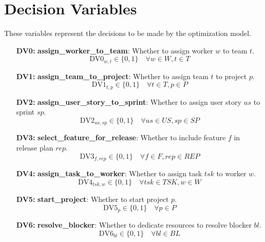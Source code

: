 \documentclass{article}
\begin{document}
\section{Decision Variables}
These variables represent the decisions to be made by the optimization model.
\begin{itemize}
    \item[\textbf{DV0:}] \textbf{assign\_worker\_to\_team}: Whether to assign worker $w$ to team $t$.
    \begin{equation*}
        \text{DV0}_{w,t} \in \{0, 1\} \quad \forall w \in W, t \in T
    \end{equation*}
    \item[\textbf{DV1:}] \textbf{assign\_team\_to\_project}: Whether to assign team $t$ to project $p$.
    \begin{equation*}
        \text{DV1}_{t,p} \in \{0, 1\} \quad \forall t \in T, p \in P
    \end{equation*}
    \item[\textbf{DV2:}] \textbf{assign\_user\_story\_to\_sprint}: Whether to assign user story $us$ to sprint $sp$.
    \begin{equation*}
        \text{DV2}_{us,sp} \in \{0, 1\} \quad \forall us \in US, sp \in SP
    \end{equation*}
     \item[\textbf{DV3:}] \textbf{select\_feature\_for\_release}: Whether to include feature $f$ in release plan $rep$.
    \begin{equation*}
        \text{DV3}_{f,rep} \in \{0, 1\} \quad \forall f \in F, rep \in REP
    \end{equation*}
    \item[\textbf{DV4:}] \textbf{assign\_task\_to\_worker}: Whether to assign task $tsk$ to worker $w$.
    \begin{equation*}
        \text{DV4}_{tsk,w} \in \{0, 1\} \quad \forall tsk \in TSK, w \in W
    \end{equation*}
    \item[\textbf{DV5:}] \textbf{start\_project}: Whether to start project $p$.
    \begin{equation*}
        \text{DV5}_{p} \in \{0, 1\} \quad \forall p \in P
    \end{equation*}
     \item[\textbf{DV6:}] \textbf{resolve\_blocker}: Whether to dedicate resources to resolve blocker $bl$.
    \begin{equation*}
        \text{DV6}_{bl} \in \{0, 1\} \quad \forall bl \in BL
    \end{equation*}
\end{itemize}
\end{document}
